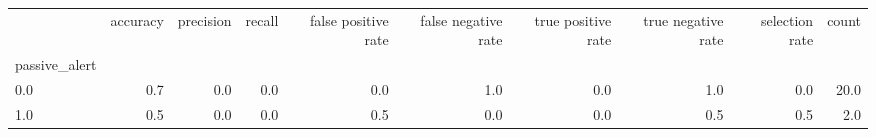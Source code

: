 \begin{tabular}{lrrrrrrrrr}
\toprule
{} &  accuracy &  precision &  recall &  false positive rate &  false negative rate &  true positive rate &  true negative rate &  selection rate &  count \\
passive\_alert &           &            &         &                      &                      &                     &                     &                 &        \\
\midrule
0.0           &       0.7 &        0.0 &     0.0 &                  0.0 &                  1.0 &                 0.0 &                 1.0 &             0.0 &   20.0 \\
1.0           &       0.5 &        0.0 &     0.0 &                  0.5 &                  0.0 &                 0.0 &                 0.5 &             0.5 &    2.0 \\
\bottomrule
\end{tabular}
